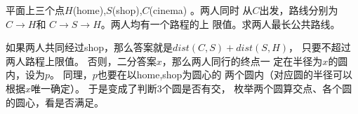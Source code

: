 \begin{prob}
	平面上三个点$H$(home),$S$(shop),$C$(cinema)
	。两人同时
	从$C$出发，路线分别为$C \to H$和
	$C \to S \to H$。两人均有一个路程的上
	限值。求两人最长公共路线。
\end{prob}

\begin{sol}
	如果两人共同经过shop，那么答案就是$dist(C,S)+dist(S,H)$，
	只要不超过两人路程上限值。
	否则，二分答案$x$，那么两人同行的终点一
	定在半径为$x$的圆内，设为$p$。
	同理，$p$也要在以home,shop为圆心的
	两个圆内（对应圆的半径可以根据$x$唯一确定）。
	于是变成了判断3个圆是否有交，
	枚举两个圆算交点、各个圆的圆心，看是否满足。
\end{sol}

